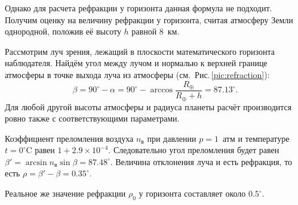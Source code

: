 Однако для расчета рефракции у горизонта данная формула не подходит. Получим оценку на величину рефракции у горизонта, считая атмосферу Земли однородной, положив её высоту $h$ равной 8~км. 

Рассмотрим луч зрения, лежащий в плоскости математического горизонта наблюдателя. Найдём угол между лучом и нормалью к верхней границе атмосферы в точке выхода луча из атмосферы (см.~Рис.\,\ref{pic:refraction}):
\begin{equation*}
    \beta = 90^\circ - \alpha = 90^\circ - \arccos \frac{R_\oplus}{R_\oplus + h} = 87.13^\circ.
\end{equation*}
Для любой другой высоты атмосферы и радиуса планеты расчёт производится ровно также с соответствующими параметрами.

Коэффициент преломления воздуха $n_\text{в}$ при давлении $p = 1$~атм и температуре $t=0^\circ\text{C}$ равен $1 + 2.9\times 10^{-4}$. Следовательно угол преломления будет равен $\beta' = \arcsin n_\text{в} \sin \beta = 87.48^\circ$. Величина отклонения луча и есть рефракция, то есть $\rho = \beta' - \beta = 0.35^\circ$.

Реальное же значение рефракции $\rho_0$ у горизонта составляет около $0.5^\circ$.


